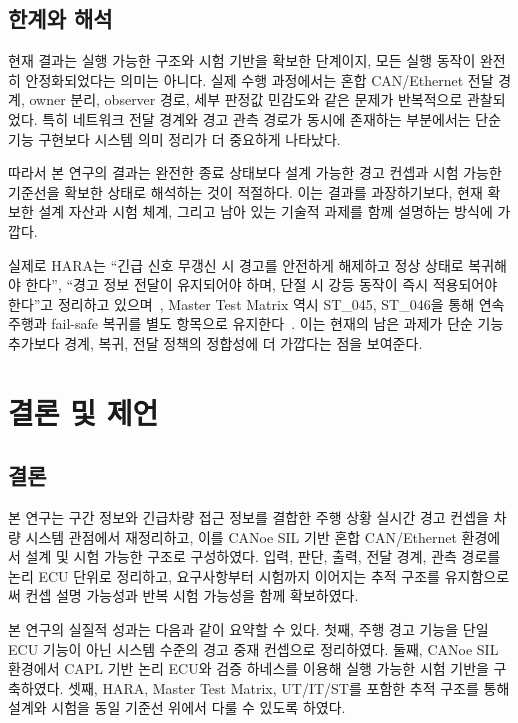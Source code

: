 \documentclass[11pt,a4paper]{article}
\begin{document}
\subsection{한계와 해석}

현재 결과는 실행 가능한 구조와 시험 기반을 확보한 단계이지, 모든 실행 동작이 완전히 안정화되었다는 의미는 아니다. 실제 수행 과정에서는 혼합 CAN/Ethernet 전달 경계, owner 분리, observer 경로, 세부 판정값 민감도와 같은 문제가 반복적으로 관찰되었다. 특히 네트워크 전달 경계와 경고 관측 경로가 동시에 존재하는 부분에서는 단순 기능 구현보다 시스템 의미 정리가 더 중요하게 나타났다.

따라서 본 연구의 결과는 완전한 종료 상태보다 설계 가능한 경고 컨셉과 시험 가능한 기준선을 확보한 상태로 해석하는 것이 적절하다. 이는 결과를 과장하기보다, 현재 확보한 설계 자산과 시험 체계, 그리고 남아 있는 기술적 과제를 함께 설명하는 방식에 가깝다.

실제로 HARA는 ``긴급 신호 무갱신 시 경고를 안전하게 해제하고 정상 상태로 복귀해야 한다'', ``경고 정보 전달이 유지되어야 하며, 단절 시 강등 동작이 즉시 적용되어야 한다''고 정리하고 있으며~\cite{hara}, Master Test Matrix 역시 ST\_045, ST\_046을 통해 연속 주행과 fail-safe 복귀를 별도 항목으로 유지한다~\cite{master_test_matrix}. 이는 현재의 남은 과제가 단순 기능 추가보다 경계, 복귀, 전달 정책의 정합성에 더 가깝다는 점을 보여준다.

\section{결론 및 제언}

\subsection{결론}

본 연구는 구간 정보와 긴급차량 접근 정보를 결합한 주행 상황 실시간 경고 컨셉을 차량 시스템 관점에서 재정리하고, 이를 CANoe SIL 기반 혼합 CAN/Ethernet 환경에서 설계 및 시험 가능한 구조로 구성하였다. 입력, 판단, 출력, 전달 경계, 관측 경로를 논리 ECU 단위로 정리하고, 요구사항부터 시험까지 이어지는 추적 구조를 유지함으로써 컨셉 설명 가능성과 반복 시험 가능성을 함께 확보하였다.

본 연구의 실질적 성과는 다음과 같이 요약할 수 있다. 첫째, 주행 경고 기능을 단일 ECU 기능이 아닌 시스템 수준의 경고 중재 컨셉으로 정리하였다. 둘째, CANoe SIL 환경에서 CAPL 기반 논리 ECU와 검증 하네스를 이용해 실행 가능한 시험 기반을 구축하였다. 셋째, HARA, Master Test Matrix, UT/IT/ST를 포함한 추적 구조를 통해 설계와 시험을 동일 기준선 위에서 다룰 수 있도록 하였다.
\end{document}
